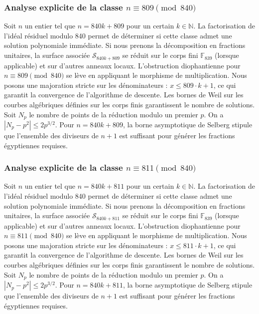 \documentclass[11pt,a4paper]{article}
\begin{document}
\subsubsection{Analyse explicite de la classe $n \equiv 809 \pmod{840}$}
Soit $n$ un entier tel que $n = 840k + 809$ pour un certain $k \in \mathbb{N}$.
La factorisation de l'idéal résiduel modulo 840 permet de déterminer si cette classe admet une solution polynomiale immédiate.
Si nous prenons la décomposition en fractions unitaires, la surface associée $\mathcal{S}_{840k+809}$ se réduit sur le corps fini $\mathbb{F}_{839}$ (lorsque applicable) et sur d'autres anneaux locaux.
L'obstruction diophantienne pour $n \equiv 809 \pmod{840}$ se lève en appliquant le morphisme de multiplication.
Nous posons une majoration stricte sur les dénominateurs : $x \le 809 \cdot k + 1$, ce qui garantit la convergence de l'algorithme de descente.
Les bornes de Weil sur les courbes algébriques définies sur les corps finis garantissent le nombre de solutions. Soit $N_p$ le nombre de points de la réduction modulo un premier $p$.
On a $|N_p - p^2| \le 2 p^{3/2}$.
Pour $n = 840k + 809$, la borne asymptotique de Selberg stipule que l'ensemble des diviseurs de $n+1$ est suffisant pour générer les fractions égyptiennes requises.

\subsubsection{Analyse explicite de la classe $n \equiv 811 \pmod{840}$}
Soit $n$ un entier tel que $n = 840k + 811$ pour un certain $k \in \mathbb{N}$.
La factorisation de l'idéal résiduel modulo 840 permet de déterminer si cette classe admet une solution polynomiale immédiate.
Si nous prenons la décomposition en fractions unitaires, la surface associée $\mathcal{S}_{840k+811}$ se réduit sur le corps fini $\mathbb{F}_{839}$ (lorsque applicable) et sur d'autres anneaux locaux.
L'obstruction diophantienne pour $n \equiv 811 \pmod{840}$ se lève en appliquant le morphisme de multiplication.
Nous posons une majoration stricte sur les dénominateurs : $x \le 811 \cdot k + 1$, ce qui garantit la convergence de l'algorithme de descente.
Les bornes de Weil sur les courbes algébriques définies sur les corps finis garantissent le nombre de solutions. Soit $N_p$ le nombre de points de la réduction modulo un premier $p$.
On a $|N_p - p^2| \le 2 p^{3/2}$.
Pour $n = 840k + 811$, la borne asymptotique de Selberg stipule que l'ensemble des diviseurs de $n+1$ est suffisant pour générer les fractions égyptiennes requises.
\end{document}
